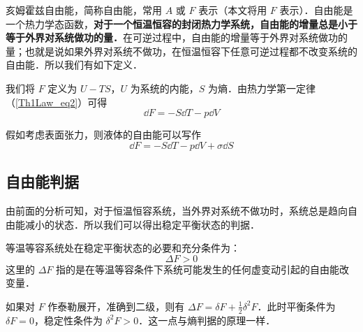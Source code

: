 

亥姆霍兹自由能，简称自由能，常用 $A$ 或 $F$ 表示（本文将用 $F$ 表示）．自由能是一个热力学态函数，\textbf{对于一个恒温恒容的封闭热力学系统，自由能的增量总是小于等于外界对系统做功的量．}在可逆过程中，自由能的增量等于外界对系统做功的量；也就是说如果外界对系统不做功，在恒温恒容下任意可逆过程都不改变系统的自由能．所以我们有如下定义．

我们将 $F$ 定义为 $U-TS$，$U$ 为系统的内能，$S$ 为熵．由热力学第一定律（\autoref{Th1Law_eq2}）可得
\begin{equation}
\dd F=-S\dd T-p\dd V
\end{equation}

假如考虑表面张力，则液体的自由能可以写作
\begin{equation}
\dd F=-S\dd T-p \dd V+\sigma \dd S
\end{equation}
\subsection{自由能判据}
由前面的分析可知，对于恒温恒容系统，当外界对系统不做功时，系统总是趋向自由能减小的状态．所以我们可以得出稳定平衡状态的判据．

等温等容系统处在稳定平衡状态的必要和充分条件为：
\begin{equation}
\Delta F>0
\end{equation}
这里的 $\Delta F$ 指的是在等温等容条件下系统可能发生的任何虚变动引起的自由能改变量．

如果对 $F$ 作泰勒展开，准确到二级，则有 $\Delta F=\delta F+\frac{1}{2}\delta^2 F$．此时平衡条件为 $\delta F=0$，稳定性条件为 $\delta^2 F>0$．这一点与熵判据的原理一样．
